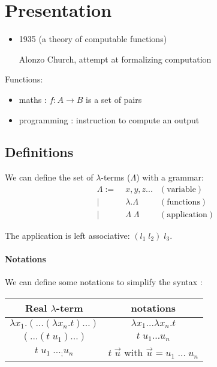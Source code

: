 \section{Presentation}

  \begin{itemize}
    \item 1935 (a theory of computable functions)

      Alonzo Church, attempt at formalizing computation
  \end{itemize}

  Functions:
  \begin{itemize}
    \item maths : $f : A \to B$ is a set of pairs
    \item programming : instruction to compute an output
  \end{itemize}

  \subsection{Definitions}

  We can define the set of $\lambda$-terms ($\Lambda$) with a grammar:
  \begin{align*}
    \Lambda :=&\; x, y, z ...         & (\text{variable}) \\
             |&\; \lambda. \Lambda    & (\text{functions}) \\
             |&\; \Lambda\; \Lambda   & (\text{application})
  \end{align*}

  The application is left associative: $(l_1\; l_2)\; l_3$.

  \paragraph{Notations} We can define some notations to simplify the syntax :

  \begin{center}
  \begin{tabular}{ c|c }
    Real $\lambda$-term & notations \\
    \hline
    $\lambda x_1.(\ldots(\lambda x_n. t)\ldots)$ & $\lambda x_1 \ldots
    \lambda x_n. t$ \\
    $(\ldots (t\; u_1)\ldots)$ & $t\;u_1 \ldots u_n$ \\
    $t\; u_1\; \ldots_; u_n$ & $t\; \vec{u}$ with $\vec u = u_1\; \ldots\; u_n$
  \end{tabular}
  \end{center}

